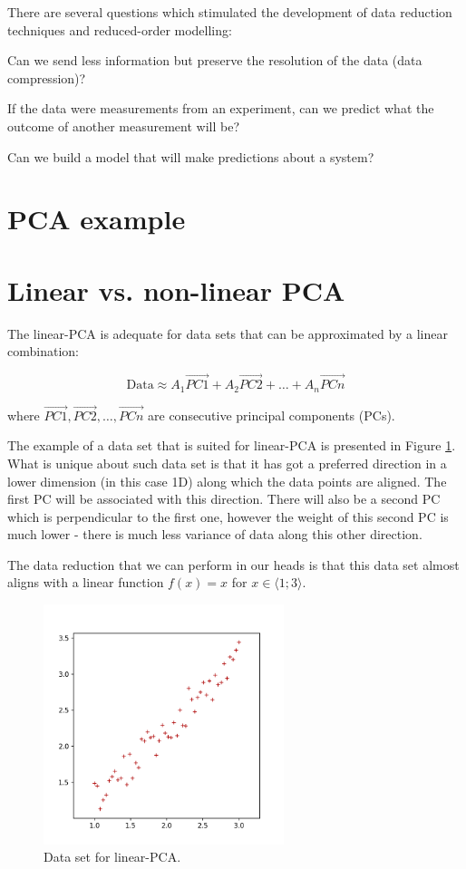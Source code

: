 \documentclass[10pt,twocolumn]{article}
\begin{document}
There are several questions which stimulated the development of data reduction techniques and reduced-order modelling:

Can we send less information but preserve the resolution of the data (data compression)?

If the data were measurements from an experiment, can we predict what the outcome of another measurement will be?

Can we build a model that will make predictions about a system?

\section{PCA example}

\section{Linear vs. non-linear PCA}

The linear-PCA is adequate for data sets that can be approximated by a linear combination:

\begin{equation}
\text{Data} \approx A_1 \vec{PC1} + A_2 \vec{PC2} + \dots + A_n \vec{PCn}
\end{equation}

where $\vec{PC1}, \vec{PC2}, \dots, \vec{PCn}$ are consecutive principal components (PCs).

The example of a data set that is suited for linear-PCA is presented in Figure \ref{fig:linear_PCA_data}. What is unique about such data set is that it has got a preferred direction in a lower dimension (in this case 1D) along which the data points are aligned. The first PC will be associated with this direction. There will also be a second PC which is perpendicular to the first one, however the weight of this second PC is much lower - there is much less variance of data along this other direction.

The data reduction that we can perform in our heads is that this data set almost aligns with a linear function $f(x) = x$ for $x \in \langle 1; 3 \rangle$.

\begin{figure}[H]
\centering\includegraphics[width=7cm]{../python-graphs/PCA_linear_scatter_1.png}
\caption{Data set for linear-PCA.}			
\label{fig:linear_PCA_data}
\end{figure}
\end{document}

